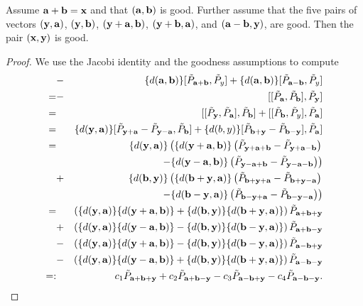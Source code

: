\begin{lemma}\label{lemma_trueforab}
	Assume $\aab + \bb = \xx$ and that $(\aab,\bb)$ is good. Further assume that the five pairs of vectors $(\yy, \aab)$, $(\yy, \bb)$, $(\yy+\aab,\bb)$, $(\yy+\bb,\aab)$, and $(\aab-\bb, \yy)$, are good. Then the pair $(\xx,\yy)$ is good.
\end{lemma}
\begin{proof}
We  use the Jacobi identity and the goodness assumptions to compute
	\begin{eqnarray*}
&-&\{d(\aab, \bb)\} [\tilde{P}_{\aab+\bb}, \tilde{P}_y] + \{d(\aab, \bb)\} [\tilde{P}_{\aab-\bb}, \tilde{P}_y] \\
=&-&[[\tilde{P}_{\aab}, \tilde{P}_{\bb}], \tilde{P}_{\yy}] \\
=&&[[\tilde{P}_{\yy}, \tilde{P}_{\aab}], \tilde{P}_{\bb}] + [[\tilde{P}_{\bb}, \tilde{P}_y], \tilde{P}_{\aab}] \\
=&&\{d(\yy, \aab)\} [\tilde{P}_{\yy+\aab} - \tilde{P}_{\yy-\aab}, \tilde{P}_{\bb}] + \{d(b,y)\} [\tilde{P}_{\bb+\yy} - \tilde{P}_{\bb-\yy}], \tilde{P}_{\aab}] \\
=&&\{d(\yy,\aab)\} \left( \{d(\yy+\aab, \bb)\} \left( \tilde{P}_{\yy+\aab+\bb} - \tilde{P}_{\yy+\aab-\bb} \right) \right. \\
&& \left. \qquad\qquad -\{d(\yy-\aab,\bb)\} \left( \tilde{P}_{\yy-\aab+\bb} - \tilde{P}_{\yy-\aab-\bb} \right) \right) \\
&+&\{d(\bb,\yy)\} \left( \{d(\bb+\yy, \aab)\} \left( \tilde{P}_{\bb+\yy+\aab} - \tilde{P}_{\bb+\yy-\aab} \right) \right. \\
&& \left. \qquad\qquad -\{d(\bb-\yy, \aab)\} \left( \tilde{P}_{\bb-\yy+\aab} - \tilde{P}_{\bb-\yy-\aab} \right) \right) \\
=&& \left( \{d(\yy,\aab)\} \{d(\yy+\aab,\bb)\} + \{d(\bb,\yy)\} \{d(\bb+\yy,\aab)\} \right) \tilde{P}_{\aab+\bb+\yy} \\
&+& \left( \{d(\yy,\aab)\} \{d(\yy-\aab,\bb)\} - \{d(\bb,\yy)\} \{d(\bb-\yy,\aab)\} \right) \tilde{P}_{\aab+\bb-\yy} \\
&-& \left( \{d(\yy,\aab)\} \{d(\yy+\aab,\bb)\} - \{d(\bb,\yy)\} \{d(\bb-\yy,\aab)\} \right) \tilde{P}_{\aab-\bb+\yy} \\
&-& \left( \{d(\yy,\aab)\} \{d(\yy-\aab,\bb)\} + \{d(\bb,\yy)\} \{d(\bb+\yy,\aab)\} \right) \tilde{P}_{\aab-\bb-\yy} \\
=:&& c_1 \tilde{P}_{\aab+\bb+\yy} + c_2 \tilde{P}_{\aab+\bb-\yy} - c_3 \tilde{P}_{\aab-\bb+\yy} - c_4 \tilde{P}_{\aab-\bb-\yy}.
	\end{eqnarray*}

\end{proof}
